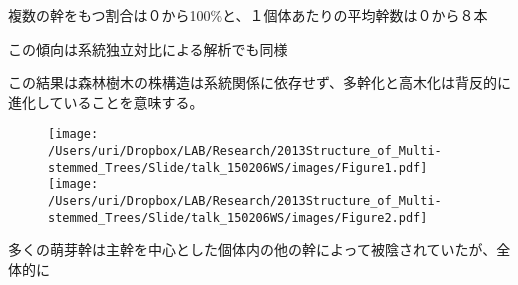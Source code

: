 \documentclass[a0, 36pt, plainboxedsections]{sciposter} %
\renewcommand{\baselinestretch}{1.2}
\begin{document}
\begin{multicols}{3}

\renewcommand{\baselinestretch}{0.8}
\begin{mdframed}[style=subsection.frame]
  \huge\textbf{}
\end{mdframed}
\renewcommand{\baselinestretch}{1.2}

複数の幹をもつ割合は０から100\%と、１個体あたりの平均幹数は０から８本

\columnbreak
\renewcommand{\baselinestretch}{0.8}
\begin{mdframed}[style=subsection.frame]
  \huge\textbf{}
\end{mdframed}
\renewcommand{\baselinestretch}{1.2} %

\begin{list}{}{\setlength{\itemindent}{1em}}
  \item この傾向は系統独立対比による解析でも同様
\end{list}

この結果は森林樹木の株構造は系統関係に依存せず、多幹化と高木化は背反的に進化していることを意味する。

\begin{figure}
	\begin{center}
		\texttt{[image: /Users/uri/Dropbox/LAB/Research/2013Structure\_of\_Multi-stemmed\_Trees/Slide/talk\_150206WS/images/Figure1.pdf]}
		\texttt{[image: /Users/uri/Dropbox/LAB/Research/2013Structure\_of\_Multi-stemmed\_Trees/Slide/talk\_150206WS/images/Figure2.pdf]}
	\end{center}
\end{figure}

\columnbreak
\renewcommand{\baselinestretch}{0.8}
\begin{mdframed}[style=subsection.frame]
  \huge\textbf{}
\end{mdframed}
\renewcommand{\baselinestretch}{1.2}

多くの萌芽幹は主幹を中心とした個体内の他の幹によって被陰されていたが、全体的に

\end{multicols}
\begin{mdframed}[style=section.frame]
  \centering\huge\textbf{}
\end{mdframed}
\end{document}
